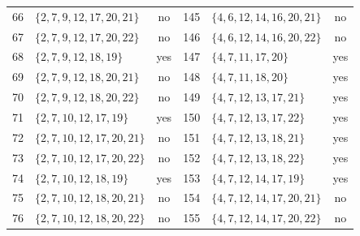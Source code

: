 \documentclass[aps,pra,reprint,superscriptaddress,longbibliography,nofootinbib,floatfix,10pt]{revtex4-2}
\theoremstyle{definition}
\begin{document}
\begin{longtable}{rlc@{\qquad}rlc}
66 & $\{2,\allowbreak 7,\allowbreak 9,\allowbreak 12,\allowbreak 17,\allowbreak 20,\allowbreak 21\}$ & no & 145 & $\{4,\allowbreak 6,\allowbreak 12,\allowbreak 14,\allowbreak 16,\allowbreak 20,\allowbreak 21\}$ & no\\
67 & $\{2,\allowbreak 7,\allowbreak 9,\allowbreak 12,\allowbreak 17,\allowbreak 20,\allowbreak 22\}$ & no & 146 & $\{4,\allowbreak 6,\allowbreak 12,\allowbreak 14,\allowbreak 16,\allowbreak 20,\allowbreak 22\}$ & no\\
68 & $\{2,\allowbreak 7,\allowbreak 9,\allowbreak 12,\allowbreak 18,\allowbreak 19\}$ & yes & 147 & $\{4,\allowbreak 7,\allowbreak 11,\allowbreak 17,\allowbreak 20\}$ & yes\\
69 & $\{2,\allowbreak 7,\allowbreak 9,\allowbreak 12,\allowbreak 18,\allowbreak 20,\allowbreak 21\}$ & no & 148 & $\{4,\allowbreak 7,\allowbreak 11,\allowbreak 18,\allowbreak 20\}$ & yes\\
70 & $\{2,\allowbreak 7,\allowbreak 9,\allowbreak 12,\allowbreak 18,\allowbreak 20,\allowbreak 22\}$ & no & 149 & $\{4,\allowbreak 7,\allowbreak 12,\allowbreak 13,\allowbreak 17,\allowbreak 21\}$ & yes\\
71 & $\{2,\allowbreak 7,\allowbreak 10,\allowbreak 12,\allowbreak 17,\allowbreak 19\}$ & yes & 150 & $\{4,\allowbreak 7,\allowbreak 12,\allowbreak 13,\allowbreak 17,\allowbreak 22\}$ & yes\\
72 & $\{2,\allowbreak 7,\allowbreak 10,\allowbreak 12,\allowbreak 17,\allowbreak 20,\allowbreak 21\}$ & no & 151 & $\{4,\allowbreak 7,\allowbreak 12,\allowbreak 13,\allowbreak 18,\allowbreak 21\}$ & yes\\
73 & $\{2,\allowbreak 7,\allowbreak 10,\allowbreak 12,\allowbreak 17,\allowbreak 20,\allowbreak 22\}$ & no & 152 & $\{4,\allowbreak 7,\allowbreak 12,\allowbreak 13,\allowbreak 18,\allowbreak 22\}$ & yes\\
74 & $\{2,\allowbreak 7,\allowbreak 10,\allowbreak 12,\allowbreak 18,\allowbreak 19\}$ & yes & 153 & $\{4,\allowbreak 7,\allowbreak 12,\allowbreak 14,\allowbreak 17,\allowbreak 19\}$ & yes\\
75 & $\{2,\allowbreak 7,\allowbreak 10,\allowbreak 12,\allowbreak 18,\allowbreak 20,\allowbreak 21\}$ & no & 154 & $\{4,\allowbreak 7,\allowbreak 12,\allowbreak 14,\allowbreak 17,\allowbreak 20,\allowbreak 21\}$ & no\\
76 & $\{2,\allowbreak 7,\allowbreak 10,\allowbreak 12,\allowbreak 18,\allowbreak 20,\allowbreak 22\}$ & no & 155 & $\{4,\allowbreak 7,\allowbreak 12,\allowbreak 14,\allowbreak 17,\allowbreak 20,\allowbreak 22\}$ & no\\

\end{longtable}
\end{document}
